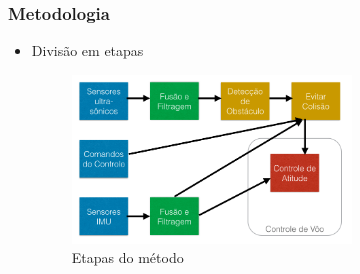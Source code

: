 \documentclass{beamer}
\begin{document}
\begin{frame}[allowframebreaks]
	
	\frametitle{Metodologia}
	
	\begin{itemize}
		
		
	
		\item Divisão em etapas
		
		\begin{figure}[h]
			\centering
			\includegraphics[keepaspectratio = true,
			width=0.7\textwidth]{img/etapasMetodo.png}
			\caption{Etapas do método}
			\label{fig:etapasMetodo}
		\end{figure}
		
	\framebreak
	
	

\end{itemize}
\end{frame}
\end{document}
